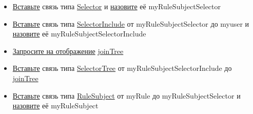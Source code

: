 \begin{itemize}
  \item \hyperlink{DeepCase.InsertLink.Description}{Вставьте} связь типа
  \hyperlink{Core.Selector.Description}{Selector} и
  \hyperlink{FAQ.HowToSetName}{назовите} её myRuleSubjectSelector
  \item \hyperlink{DeepCase.InsertLink.Description}{Вставьте} связь типа
  \hyperlink{Core.SelectorInclude.Description}{SelectorInclude} от myRuleSubjectSelector до myuser и
  \hyperlink{FAQ.HowToSetName}{назовите} её myRuleSubjectSelectorInclude
  \item \hyperlink{Core.Query.Description}{Запросите на отображение} \hyperlink{Core.joinTree.Description}{joinTree}
  \item \hyperlink{DeepCase.InsertLink.Description}{Вставьте} связь типа
  \hyperlink{Core.SelectorTree.Description}{SelectorTree} от myRuleSubjectSelectorInclude до \hyperlink{Core.joinTree.Description}{joinTree}
  \item \hyperlink{DeepCase.InsertLink.Description}{Вставьте} связь типа
  \hyperlink{Core.RuleSubject.Description}{RuleSubject} от myRule до myRuleSubjectSelector и
  \hyperlink{FAQ.HowToSetName}{назовите} её myRuleSubject
\end{itemize}